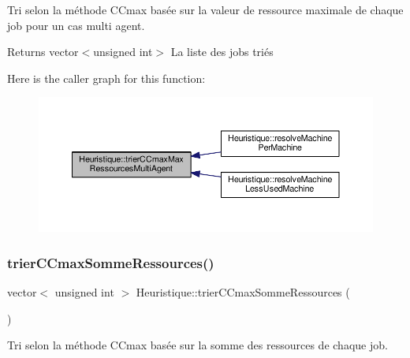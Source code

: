 Tri selon la méthode C\+Cmax basée sur la valeur de ressource maximale de chaque job pour un cas multi agent. 

\begin{DoxyReturn}{Returns}
vector$<$unsigned int$>$ La liste des jobs triés 
\end{DoxyReturn}
Here is the caller graph for this function\+:
\nopagebreak
\begin{figure}[H]
\begin{center}
\leavevmode
\includegraphics[width=350pt]{classHeuristique_a177908d75131594fb1a37bd1a5b795f0_icgraph}
\end{center}
\end{figure}
\mbox{\label{classHeuristique_a38c390423fc2b190da599148ca879cd6}} 
\subsubsection{\texorpdfstring{trier\+C\+Cmax\+Somme\+Ressources()}{trierCCmaxSommeRessources()}}
{\footnotesize\ttfamily vector$<$ unsigned int $>$ Heuristique\+::trier\+C\+Cmax\+Somme\+Ressources (\begin{DoxyParamCaption}{ }\end{DoxyParamCaption})}



Tri selon la méthode C\+Cmax basée sur la somme des ressources de chaque job. 

